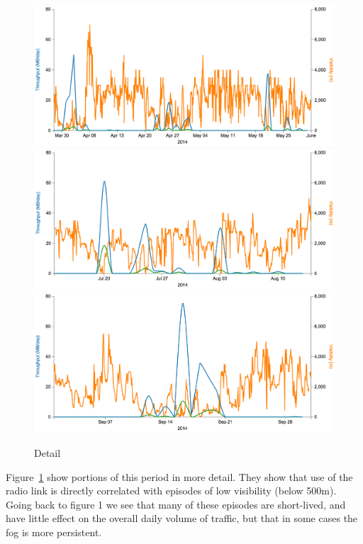 \begin{figure}
  \centering
  \includegraphics[width=\textwidth]{results/fig3-Wireless-28-March-1-June}
  \includegraphics[width=\textwidth]{results/fig4-Wireless-14-July-14-Aug}
  \includegraphics[width=\textwidth]{results/fig5-Wireless-September}
  \caption{Detail}
  \label{fig:throughput_detail}
\end{figure}
Figure~\ref{fig:throughput_detail} show portions of this period in
more detail. They show that use of the radio link is directly
correlated with episodes of low visibility (below 500m). Going back to
figure 1 we see that many of these episodes are short-lived, and have
little effect on the overall daily volume of traffic, but that in some
cases the fog is more persistent.

